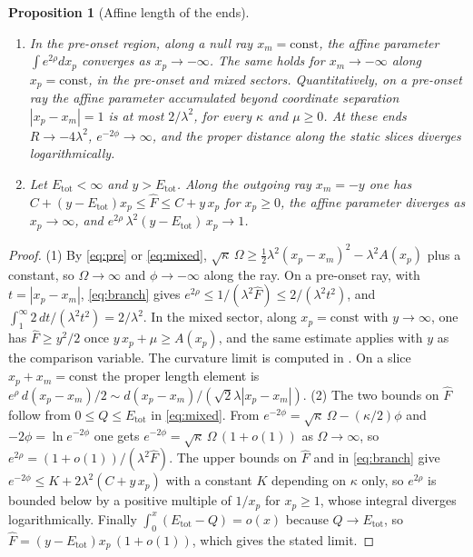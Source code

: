\documentclass[11pt]{article}
\newtheorem{proposition}{Proposition}
\theoremstyle{remark}
\newcommand{\Etot}{E_{\mathrm{tot}}}
\newcommand{\Fh}{\widehat F}
\begin{document}
\begin{proposition}[Affine length of the ends]\label{prop:affine}
\begin{enumerate}
\item In the pre-onset region, along a null ray $x_m=\text{const}$, the affine parameter $\int e^{2\rho}dx_p$ converges as $x_p\to-\infty$. The same holds for $x_m\to-\infty$ along $x_p=\text{const}$, in the pre-onset and mixed sectors. Quantitatively, on a pre-onset ray the affine parameter accumulated beyond coordinate separation $|x_p-x_m|=1$ is at most $2/\lambda^2$, for every $\kappa$ and $\mu\ge0$. At these ends $R\to-4\lambda^2$, $e^{-2\phi}\to\infty$, and the proper distance along the static slices diverges logarithmically.
\item Let $\Etot<\infty$ and $y>\Etot$. Along the outgoing ray $x_m=-y$ one has $C+(y-\Etot)x_p\le\Fh\le C+y\,x_p$ for $x_p\ge0$, the affine parameter diverges as $x_p\to\infty$, and $e^{2\rho}\,\lambda^2(y-\Etot)\,x_p\to1$.
\end{enumerate}
\end{proposition}
\begin{proof}
(1) By \eqref{eq:pre} or \eqref{eq:mixed}, $\sqrt\kappa\,\Omega\ge\tfrac12\lambda^2(x_p-x_m)^2-\lambda^2A(x_p)$ plus a constant, so $\Omega\to\infty$ and $\phi\to-\infty$ along the ray. On a pre-onset ray, with $t=|x_p-x_m|$, \eqref{eq:branch} gives $e^{2\rho}\le1/(\lambda^2\Fh)\le2/(\lambda^2t^2)$, and $\int_1^\infty2\,dt/(\lambda^2t^2)=2/\lambda^2$. In the mixed sector, along $x_p=\text{const}$ with $y\to\infty$, one has $\Fh\ge y^2/2$ once $y\,x_p+\mu\ge A(x_p)$, and the same estimate applies with $y$ as the comparison variable. The curvature limit is computed in \cite{KimSon}. On a slice $x_p+x_m=\text{const}$ the proper length element is $e^{\rho}\,d(x_p-x_m)/2\sim d(x_p-x_m)/(\sqrt2\lambda|x_p-x_m|)$. (2) The two bounds on $\Fh$ follow from $0\le Q\le\Etot$ in \eqref{eq:mixed}. From $e^{-2\phi}=\sqrt\kappa\,\Omega-(\kappa/2)\phi$ and $-2\phi=\ln e^{-2\phi}$ one gets $e^{-2\phi}=\sqrt\kappa\,\Omega\,(1+o(1))$ as $\Omega\to\infty$, so $e^{2\rho}=(1+o(1))/(\lambda^2\Fh)$. The upper bounds on $\Fh$ and in \eqref{eq:branch} give $e^{-2\phi}\le K+2\lambda^2(C+y\,x_p)$ with a constant $K$ depending on $\kappa$ only, so $e^{2\rho}$ is bounded below by a positive multiple of $1/x_p$ for $x_p\ge1$, whose integral diverges logarithmically. Finally $\int_0^{x}(\Etot-Q)=o(x)$ because $Q\to\Etot$, so $\Fh=(y-\Etot)x_p\,(1+o(1))$, which gives the stated limit.
\end{proof}
\end{document}
